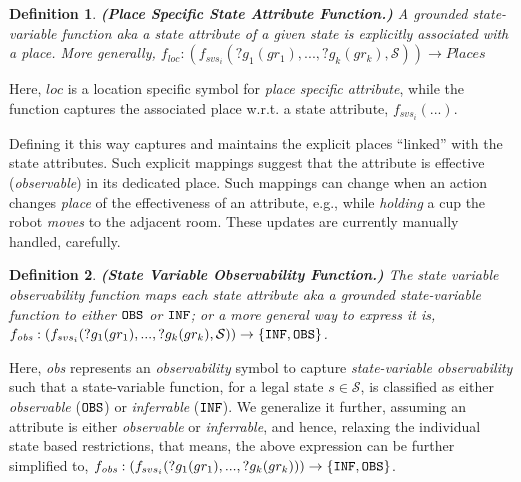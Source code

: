 \documentclass[letterpaper]{article} %
\newtheorem{definition}{Definition}
\begin{document}

\begin{definition} \label{def:pssav}
    \textbf{(Place Specific State Attribute Function.)} A {\em grounded} state-variable function {\em aka} a state attribute of a given state is explicitly associated with a place. More generally, 
    $f_{loc}: (f_{svs_i}(?g_1(gr_1),...,?g_k(gr_k),\mathcal{S})) \rightarrow Places$
\end{definition}
Here, $\mathit{loc}$ is a location specific symbol for {\em place specific attribute}, while the function captures the associated place w.r.t. a state attribute, $f_{svs_i}(...)$.

Defining it this way captures and maintains the explicit places ``linked'' with 
the state attributes. 
Such explicit mappings suggest that the attribute is effective (\textit{observable}) in its dedicated place.
Such mappings can change when an action changes \textit{place} of the effectiveness of an attribute, e.g., 
while \textit{holding} a cup the robot \textit{moves} to the adjacent room. 
These updates are currently manually handled, carefully.


\begin{definition} \label{def:svof}
\textbf{(State Variable Observability Function.)} 
The state variable observability function maps each state attribute {\em aka} a grounded \textit{state-variable function} 
to either $\texttt{OBS}$ or $\texttt{INF}$; or a more general way to express it is, $f_{\textit{obs}}: (f_{svs_i}(?g_1(gr_1),...,?g_k(gr_k),\mathcal{S}
)) \rightarrow 
    \{\texttt{INF}, \texttt{OBS}\}$.
\end{definition}
Here, \textit{obs} represents an \textit{observability} symbol to capture \textit{state-variable observability} such that a state-variable function, for a legal state $s\in\mathcal{S}$, is classified as either \textit{observable} ($\texttt{OBS}$) or \textit{inferrable} ($\texttt{INF}$). 
We generalize it further, assuming an attribute is either \textit{observable} or \textit{inferrable}, and hence, relaxing the individual state based restrictions, that means, the above expression can be further simplified to, $f_{\textit{obs}}: (f_{svs_i}(?g_1(gr_1),...,?g_k(gr_k))) \rightarrow 
    \{\texttt{INF}, \texttt{OBS}\}$.
\end{document}
